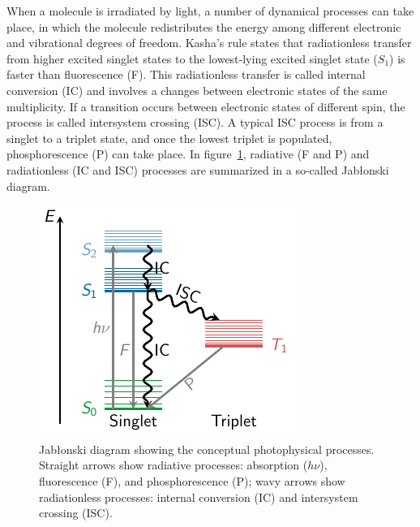 \documentclass[a4paper,10pt,DIV=15,openany]{scrbook}
\begin{document}
When a molecule is irradiated by light, a number of dynamical processes can take place, in which the molecule redistributes the energy among different electronic and vibrational degrees of freedom. Kasha's rule \cite{Kasha1950DFS} states that radiationless transfer from higher excited singlet states to the lowest-lying excited singlet state ($S_1$) is faster than fluorescence (F). This radiationless transfer is called internal conversion (IC) and involves a changes between electronic states of the same multiplicity. If a transition occurs between electronic states of different spin, the process is called intersystem crossing (ISC). A typical ISC process is from a singlet to a triplet state, and once the lowest triplet is populated, phosphorescence (P) can take place. In figure~\ref{fig:jablonski}, radiative (F and P) and radiationless (IC and ISC) processes are summarized in a so-called Jab{\l}onski diagram.

\begin{figure}[!ht]
  \centering
  \includegraphics[scale=1.4]{img/jablonski/jablonski.pdf}
  \caption[Jab{\l}onski diagram showing the conceptual photophysical processes.]{Jab{\l}onski diagram showing the conceptual photophysical processes. Straight arrows show radiative processes: absorption ($h\nu$), fluorescence (F), and phosphorescence (P); wavy arrows show radiationless processes: internal conversion (IC) and intersystem crossing (ISC). }
  \label{fig:jablonski}
\end{figure}
\end{document}
